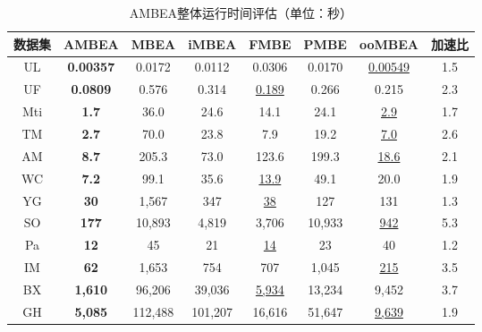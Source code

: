\begin{table} [H]
	\centering    
	\setlength{\abovecaptionskip}{0cm}  
  \setlength{\belowcaptionskip}{-0.1cm}
	\caption{AMBEA整体运行时间评估（单位：秒）}      
	\label{tbl:ambea_time}
	\setlength{\tabcolsep}{5pt}
	\begin{center}
				\normalsize{
		\begin{tabular}{|c|c|c|c|c|c|c|c|}
			\hline 

      \textbf{数据集} & \textbf{AMBEA} & \textbf{MBEA} & \textbf{iMBEA} & \textbf{FMBE} & \textbf{PMBE} & \textbf{ooMBEA} & \textbf{加速比} \\ \hline
      UL & \textbf{0.00357} & 0.0172 & 0.0112 & 0.0306 & 0.0170 & \uline{0.00549} & 1.5 \\
      UF & \textbf{0.0809} & 0.576 & 0.314 & \uline{0.189} & 0.266 & 0.215 & 2.3 \\
      Mti & \textbf{1.7} & 36.0 & 24.6 & 14.1 & 24.1 & \uline{2.9} & 1.7 \\
      TM & \textbf{2.7} & 70.0 & 23.8 & 7.9 & 19.2 & \uline{7.0} &2.6 \\
      AM & \textbf{8.7} & 205.3 & 73.0 & 123.6 & 199.3 & \uline{18.6} & 2.1 \\
      WC & \textbf{7.2} & 99.1 & 35.6 & \uline{13.9} & 49.1 & 20.0 & 1.9 \\
      YG & \textbf{30} & 1,567 & 347 & \uline{38} & 127 & 131 & 1.3\\
      SO & \textbf{177} & 10,893 & 4,819 & 3,706 & 10,933 & \uline{942} & 5.3 \\
      Pa & \textbf{12} & 45 & 21 & \uline{14} & 23 & 40 & 1.2\\
      IM & \textbf{62} & 1,653 & 754 & 707 & 1,045 & \uline{215} & 3.5 \\
      BX & \textbf{1,610} & 96,206 & 39,036 & \uline{5,934} & 13,234 & 9,452 & 3.7 \\
      GH & \textbf{5,085} & 112,488 & 101,207 & 16,616 & 51,647 & \uline{9,639} & 1.9 \\ \hline
      
		\end{tabular}
				}
	\end{center}

\end{table}
